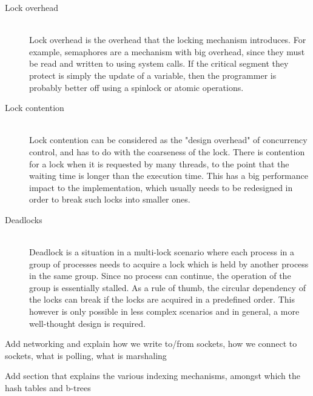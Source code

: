 \begin{description}
	\item[Lock overhead] \hfill \\
		Lock overhead is the overhead that the locking mechanism 
		introduces.  For example, semaphores are a mechanism with big 
		overhead, since they must be read and written to using system 
		calls. If the critical segment they protect is simply the 
		update of a variable, then the programmer is probably better 
		off using a spinlock or atomic operations.
	\item[Lock contention] \hfill \\
		Lock contention can be considered as the "design overhead" of 
		concurrency control, and has to do with the coarseness of the 
		lock.  There is contention for a lock when it is requested by 
		many threads, to the point that the waiting time is longer than 
		the execution time.
		This has a big performance impact to the implementation, which 
		usually needs to be redesigned in order to break such locks 
		into smaller ones.
	\item[Deadlocks] \hfill \\
		Deadlock is a situation in a multi-lock scenario where each 
		process in a group of processes needs to acquire a lock which 
		is held by another process in the same group. Since no process 
		can continue, the operation of the group is essentially 
		stalled.
		As a rule of thumb, the circular dependency of the locks can 
		break if the locks are acquired in a predefined order. This 
		however is only possible in less complex scenarios and in 
		general, a more well-thought design is required.
\end{description}

\todo Add networking and explain how we write to/from sockets, how we connect 
to sockets, what is polling, what is marshaling

\todo Add section that explains the various indexing mechanisms, amongst which 
the hash tables and b-trees
